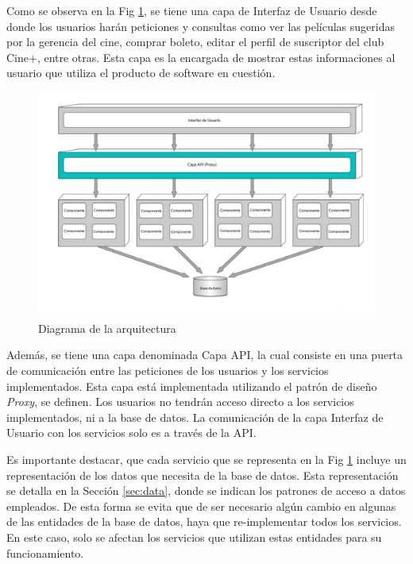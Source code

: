 Como se observa en la Fig \ref{fig:arch1}, se tiene una capa de Interfaz de Usuario desde donde los usuarios harán peticiones y consultas como ver las películas sugeridas por la gerencia del cine, comprar boleto, editar el perfil de suscriptor del club Cine+, entre otras. Esta capa es la encargada de mostrar estas informaciones al usuario que utiliza el producto de software en cuestión.

\begin{figure}
    \centering
    \includegraphics[width=15cm]{./chapters/img/architecture.png}

    \caption{Diagrama de la arquitectura}
    \label{fig:arch1}
\end{figure}

Además, se tiene una capa denominada Capa API, la cual consiste en una puerta de comunicación entre las peticiones de los usuarios y los servicios implementados. Esta capa está implementada utilizando el patrón de diseño \textit{Proxy}, se definen. Los usuarios no tendrán acceso directo a los servicios implementados, ni a la base de datos. La comunicación de la capa Interfaz de Usuario con los servicios solo es a través de la API.

Es importante destacar, que cada servicio que se representa en la Fig \ref{fig:arch1} incluye un representación de los datos que necesita de la base de datos. Esta representación se detalla en la Sección \ref{sec:data}, donde se indican los patrones de acceso a datos empleados. De esta forma se evita que de ser necesario algún cambio en algunas de las entidades de la base de datos, haya que re-implementar todos los servicios. En este caso, solo se afectan los servicios que utilizan estas entidades para su funcionamiento.